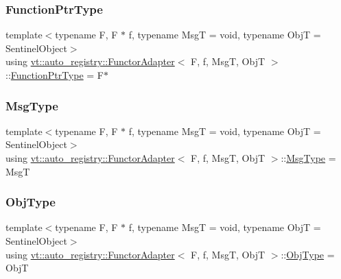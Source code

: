 \subsubsection{\texorpdfstring{Function\+Ptr\+Type}{FunctionPtrType}}
{\footnotesize\ttfamily template$<$typename F, F $\ast$ f, typename MsgT = void, typename ObjT = Sentinel\+Object$>$ \\
using \hyperlink{structvt_1_1auto__registry_1_1_functor_adapter}{vt\+::auto\+\_\+registry\+::\+Functor\+Adapter}$<$ F, f, MsgT, ObjT $>$\+::\hyperlink{structvt_1_1auto__registry_1_1_functor_adapter_a8d0182e89f1d807d0221826428285a49}{Function\+Ptr\+Type} =  F$\ast$}

\mbox{\label{structvt_1_1auto__registry_1_1_functor_adapter_a3f2d51bee96f70e8370e1892194dc599}} 
\subsubsection{\texorpdfstring{Msg\+Type}{MsgType}}
{\footnotesize\ttfamily template$<$typename F, F $\ast$ f, typename MsgT = void, typename ObjT = Sentinel\+Object$>$ \\
using \hyperlink{structvt_1_1auto__registry_1_1_functor_adapter}{vt\+::auto\+\_\+registry\+::\+Functor\+Adapter}$<$ F, f, MsgT, ObjT $>$\+::\hyperlink{structvt_1_1auto__registry_1_1_functor_adapter_a3f2d51bee96f70e8370e1892194dc599}{Msg\+Type} =  MsgT}

\mbox{\label{structvt_1_1auto__registry_1_1_functor_adapter_a7e152aa351c7ce3c7eba67ac07bfbcb4}} 
\subsubsection{\texorpdfstring{Obj\+Type}{ObjType}}
{\footnotesize\ttfamily template$<$typename F, F $\ast$ f, typename MsgT = void, typename ObjT = Sentinel\+Object$>$ \\
using \hyperlink{structvt_1_1auto__registry_1_1_functor_adapter}{vt\+::auto\+\_\+registry\+::\+Functor\+Adapter}$<$ F, f, MsgT, ObjT $>$\+::\hyperlink{structvt_1_1auto__registry_1_1_functor_adapter_a7e152aa351c7ce3c7eba67ac07bfbcb4}{Obj\+Type} =  ObjT}



